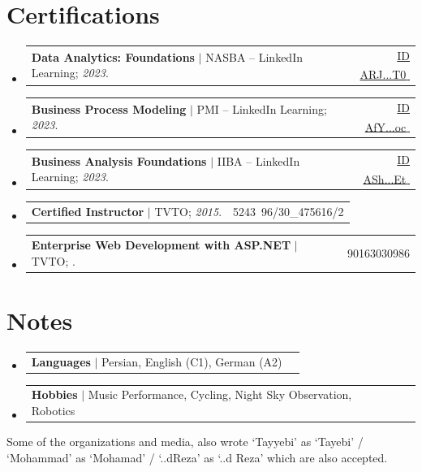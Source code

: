 \documentclass[11pt,a4paper]{article}
\makeatletter
\let\orighref\href
\renewcommand{\href}[2]{\orighref{#1}{#2\,{\textsuperscript{\tiny{\textcolor{heritagered}{\faExternalLink}}}}}}
\newcommand{\deemph}[1]{{\color{gray}#1}}
\newcommand{\resumeProjectHeading}[2]{
    \item
    \begin{tabular*}{0.97\textwidth}{l@{\extracolsep{\fill}}r}
      \small#1 & \deemph{#2} \\
    \end{tabular*}\vspace{-7pt}
}
\newcommand{\resumeSubHeadingListStart}{\begin{itemize}[leftmargin=0.15in, label={}]}
\newcommand{\resumeSubHeadingListEnd}{\end{itemize}}
\makeatother
\begin{document}


\section{Certifications}
    \resumeSubHeadingListStart
      \resumeProjectHeading
          {\textbf{Data Analytics: Foundations} $|$ NASBA -- LinkedIn Learning; \emph{2023}.}{\href{https://www.linkedin.com/learning/certificates/10c24841aac6b0c139f4971a8efd6d10356dc105124e31fa10eb32aa14ce3392}{\deemph{ID} \small{ARJ...T0}}}
      \resumeProjectHeading
          {\textbf{Business Process Modeling} $|$ PMI -- LinkedIn Learning; \emph{2023}.}{\href{https://www.linkedin.com/learning/certificates/3d1e244d9234631a908175486d19855434634d7f61cec316326ba4eb269bb041}{\deemph{ID} \small{AfY...oc}}}
      \resumeProjectHeading
          {\textbf{Business Analysis Foundations} $|$ IIBA -- LinkedIn Learning; \emph{2023}.}{\href{https://www.linkedin.com/learning/certificates/51dd265ef63b58255245c8f7438549551c92d30031e81b9ad864ee6994e1f6e6}{\deemph{ID} \small{ASh...Et}}}
       \resumeProjectHeading
           {\textbf{Certified Instructor} $|$ TVTO; \emph{2015}.}{\deemph{Contract No.} 5243\, 96/30\_475616/2}
     \resumeProjectHeading
           {\textbf{Enterprise Web Development with ASP.NET} $|$ TVTO; \emph{\highlight{2013}}.}{\deemph{No.} 90163030986}

    \resumeSubHeadingListEnd

\section{Notes}
    \resumeSubHeadingListStart

      \resumeProjectHeading{\textbf{Languages} $|$ Persian, English (C1), German (A2)}{}
      \resumeProjectHeading{\textbf{Hobbies} $|$ Music Performance, Cycling, Night Sky Observation, Robotics}{}
      
    \resumeSubHeadingListEnd        


\mbox{}
\vfill
\leavevmode
\tiny
\deemph{Some of the organizations and media, also wrote ‘Tayyebi’ as ‘Tayebi’ / ‘Mohammad’ as ‘Mohamad’ / ‘..dReza’ as ‘..d Reza’ which are also accepted.}
\end{document}
